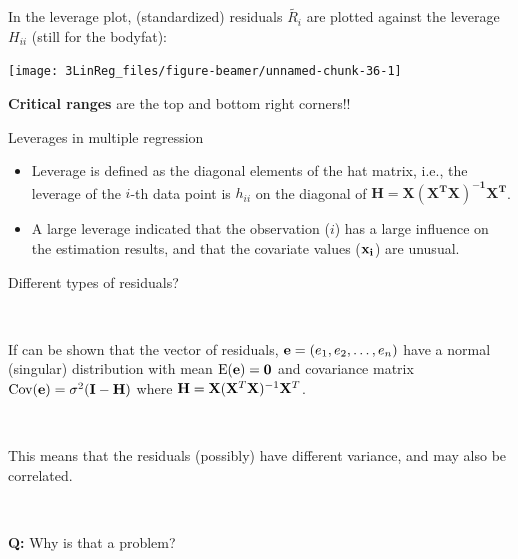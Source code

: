 \documentclass[10pt,ignorenonframetext,]{beamer}
\begin{document}
\begin{frame}

In the leverage plot, (standardized) residuals \(\tilde{R_i}\) are
plotted against the leverage \(H_{ii}\) (still for the bodyfat):

\begin{center}\texttt{[image: 3LinReg\_files/figure-beamer/unnamed-chunk-36-1]} \end{center}

\textbf{Critical ranges} are the top and bottom right corners!!

\end{frame}

\begin{frame}

\begin{block}{Leverages in multiple regression}

\vspace{3mm}

\begin{itemize}
\item
  Leverage is defined as the diagonal elements of the hat matrix, i.e.,
  the leverage of the \(i\)-th data point is \(h_{ii}\) on the diagonal
  of \(\mathbf{H = X(X^TX)^{-1}X^T}\).
\item
  A large leverage indicated that the observation (\(i\)) has a large
  influence on the estimation results, and that the covariate values
  (\(\bf{x}_i\)) are unusual.
\end{itemize}

\end{block}

\end{frame}

\begin{frame}

\begin{block}{Different types of residuals?}

\(~\)

If can be shown that the vector of residuals,
\({\bf e}=(e_1,e_2,\ldots,e_n)\) have a normal (singular) distribution
with mean \(\text{E}({\bf e})={\bf 0}\) and covariance matrix
\(\text{Cov}({\bf e})=\sigma^2({\bf I}-{\bf H})\) where
\({\bf H}={\bf X}({\bf X}^T{\bf X})^{-1}{\bf X}^T\).

\(~\)

This means that the residuals (possibly) have different variance, and
may also be correlated.

\(~\)

\textbf{Q:} Why is that a problem?

\end{block}

\end{frame}
\end{document}
